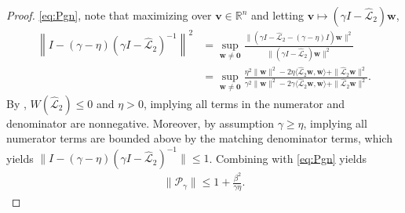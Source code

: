 \documentclass[review]{siamart}
\begin{document}
\begin{proof}
\eqref{eq:Pgn}, note that maximizing over $\mathbf{v}\in\mathbb{R}^n$ and
letting $\mathbf{v} \mapsto (\gamma I - \widehat{\mathcal{L}}_2)\mathbf{w}$,
%
\begin{align*}
\left\| I - (\gamma-\eta)(\gamma I - \widehat{\mathcal{L}}_2)^{-1}\right\|^2
& = \sup_{\mathbf{w}\neq\mathbf{0}} \frac{\| (\gamma I - \widehat{\mathcal{L}}_2 -
		(\gamma-\eta)I )\mathbf{w}\|^2}{\|(\gamma I - \widehat{\mathcal{L}}_2)
		\mathbf{w}\|^2} \\
& = \sup_{\mathbf{w}\neq\mathbf{0}} \frac{\eta^2\|\mathbf{w}\|^2
	- 2\eta\langle \widehat{\mathcal{L}}_2
		\mathbf{w},\mathbf{w}\rangle + \|\widehat{\mathcal{L}}_2\mathbf{w}\|^2}
	{\gamma^2\|\mathbf{w}\|^2 - 2\gamma \langle \widehat{\mathcal{L}}_2
		\mathbf{w},\mathbf{w}\rangle + \|\widehat{\mathcal{L}}_2\mathbf{w}\|^2}.
\end{align*}
%
By , $W(\widehat{\mathcal{L}}_2)\leq 0$ and $\eta > 0$, implying
all terms in the numerator and denominator are nonnegative. Moreover, by assumption
$\gamma \geq \eta$, implying all numerator terms are bounded above by the matching
denominator terms, which yields $\| I - (\gamma-\eta)
(\gamma I - \widehat{\mathcal{L}}_2)^{-1}\| \leq 1$.
Combining with \eqref{eq:Pgn} yields
%
\begin{align}\label{eq:Pgamma_gen}
\|\mathcal{P}_\gamma\| \leq 1 + \frac{\beta^2}{\gamma\eta}.
\end{align}
%


\end{proof}
\end{document}
